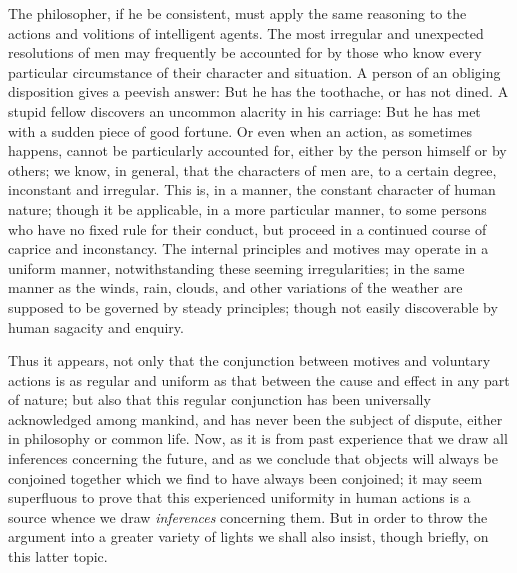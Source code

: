 \documentclass[]{article}
\begin{document}
\begin{sectionbody}
\humeparagraph  The philosopher, if he be consistent, must apply the same reasoning to the actions and volitions of intelligent agents. The most irregular and unexpected resolutions of men may frequently be accounted for by those who know every particular circumstance of their character and situation. A person of an obliging disposition gives a peevish answer: But he has the toothache, or has not dined. A stupid fellow discovers an uncommon alacrity in his carriage: But he has met with a sudden piece of good fortune. Or even when an action, as sometimes happens, cannot be particularly accounted for, either by the person himself or by others; we know, in general, that the characters of men are, to a certain degree, inconstant and irregular. This is, in a manner, the constant character of human nature; though it be applicable, in a more particular manner, to some persons who have no fixed rule for their conduct, but proceed in a continued course of caprice and inconstancy. The internal principles and motives may operate in a uniform manner, notwithstanding these seeming irregularities; in the same manner as the winds, rain, clouds, and other variations of the weather are supposed to be governed by steady principles; though not easily discoverable by human sagacity and enquiry.

\humeparagraph  Thus it appears, not only that the conjunction between motives and voluntary actions is as regular and uniform as that between the cause and effect in any part of nature; but also that this regular conjunction has been universally acknowledged among mankind, and has never been the subject of dispute, either in philosophy or common life. Now, as it is from past experience that we draw all inferences concerning the future, and as we conclude that objects will always be conjoined together which we find to have always been conjoined; it may seem superfluous to prove that this experienced uniformity in human actions is a source whence we draw \emph{inferences} concerning them. But in order to throw the argument into a greater variety of lights we shall also insist, though briefly, on this latter topic.


\end{sectionbody}
\end{document}
